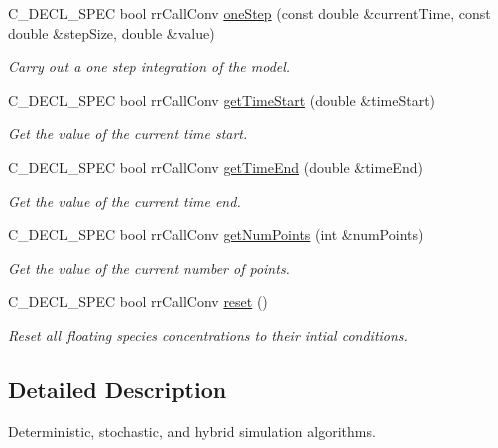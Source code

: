 \begin{DoxyCompactItemize}
\-C\-\_\-\-D\-E\-C\-L\-\_\-\-S\-P\-E\-C bool rr\-Call\-Conv \hyperlink{group__utility_ga190fff177accdfbc9c192c4993807e2e}{one\-Step} (const double \&current\-Time, const double \&step\-Size, double \&value)
\begin{DoxyCompactList}\small\item\em \-Carry out a one step integration of the model. \end{DoxyCompactList}\item 
\-C\-\_\-\-D\-E\-C\-L\-\_\-\-S\-P\-E\-C bool rr\-Call\-Conv \hyperlink{group__utility_ga18b4fbd0dc5aa3f25d58367a406f425c}{get\-Time\-Start} (double \&time\-Start)
\begin{DoxyCompactList}\small\item\em \-Get the value of the current time start. \end{DoxyCompactList}\item 
\-C\-\_\-\-D\-E\-C\-L\-\_\-\-S\-P\-E\-C bool rr\-Call\-Conv \hyperlink{group__utility_ga451e7ecddd0431316048a332410b0600}{get\-Time\-End} (double \&time\-End)
\begin{DoxyCompactList}\small\item\em \-Get the value of the current time end. \end{DoxyCompactList}\item 
\-C\-\_\-\-D\-E\-C\-L\-\_\-\-S\-P\-E\-C bool rr\-Call\-Conv \hyperlink{group__utility_gacd9cb734773710f640742a9f040dccc5}{get\-Num\-Points} (int \&num\-Points)
\begin{DoxyCompactList}\small\item\em \-Get the value of the current number of points. \end{DoxyCompactList}\item 
\-C\-\_\-\-D\-E\-C\-L\-\_\-\-S\-P\-E\-C bool rr\-Call\-Conv \hyperlink{group__utility_ga07dfaf16ab38015aab6b400665ace2b2}{reset} ()
\begin{DoxyCompactList}\small\item\em \-Reset all floating species concentrations to their intial conditions. \end{DoxyCompactList}\end{DoxyCompactItemize}


\subsection{\-Detailed \-Description}
\-Deterministic, stochastic, and hybrid simulation algorithms. 

